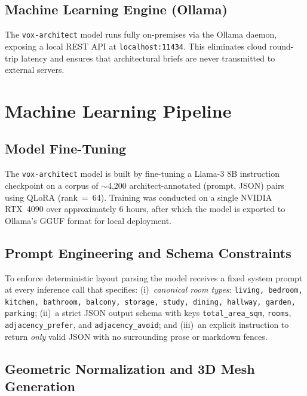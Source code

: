 \documentclass[12pt, a4paper]{article}
\begin{document}
\subsection{Machine Learning Engine (Ollama)}

The \texttt{vox-architect} model runs fully on-premises via the Ollama daemon,
exposing a local REST API at \texttt{localhost:11434}. This eliminates cloud
round-trip latency and ensures that architectural briefs are never transmitted
to external servers.

\section{Machine Learning Pipeline}

\subsection{Model Fine-Tuning}

The \texttt{vox-architect} model is built by fine-tuning a Llama-3 8B instruction
checkpoint on a corpus of $\sim$4{,}200 architect-annotated (prompt, JSON) pairs
using QLoRA (rank~=~64). Training was conducted on a single NVIDIA RTX~4090 over
approximately 6 hours, after which the model is exported to Ollama's GGUF format
for local deployment.

\subsection{Prompt Engineering and Schema Constraints}

To enforce deterministic layout parsing the model receives a fixed system prompt
at every inference call that specifies: (i)~\emph{canonical room types}:
\texttt{living, bedroom, kitchen, bathroom, balcony, storage, study, dining,
hallway, garden, parking}; (ii)~a strict JSON output schema with keys
\texttt{total\_area\_sqm}, \texttt{rooms}, \texttt{adjacency\_prefer}, and
\texttt{adjacency\_avoid}; and (iii)~an explicit instruction to return
\emph{only} valid JSON with no surrounding prose or markdown fences.

\subsection{Geometric Normalization and 3D Mesh Generation}
\end{document}
